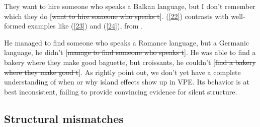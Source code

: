 \documentclass[output=paper
                ,modfonts
                ,nonflat
	        ,collection
	        ,collectionchapter
	        ,collectiontoclongg
 	        ,biblatex
                ,babelshorthands
                ,newtxmath
                ,draftmode
                ,colorlinks, citecolor=brown
]{./langsci/langscibook}
\begin{document}
{\ea *They want to hire someone who speaks a Balkan language, but I don't remember which they do [\sout{want to hire someone who speaks t}]. \citep[6]{Merchant2001}\label{22}\z
(\ref{22}) contrasts with well-formed examples like (\ref{23}) and (\ref{24}), from \citet{Ginzburg2018}.

\ea He managed to find someone who speaks a Romance language, but a Germanic language, he didn't [\sout{manage to find someone who speaks t}].\label{23}\z
\ea He was able to find a bakery where they make good baguette, but croissants, he couldn't [\sout{find a bakery where they make good t}].\label{24}\z
As \citet{Ginzburg2018} rightly point out, we don't yet have a complete understanding of when or why island effects show up in VPE. Its behavior is at best inconsistent, failing to provide convincing evidence for silent structure.


\subsection{Structural mismatches}
\label{sec-structural-mismatches}

}
\end{document}
